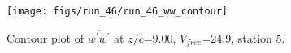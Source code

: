 \begin{figure}[H]
\centering
\texttt{[image: figs/run\_46/run\_46\_ww\_contour]}
\caption{Contour plot of $\overline{w^\prime w^\prime}$ at $z/c$=9.00, $V_{free}$=24.9, station 5.}
\label{fig:run_46_ww_contour}
\end{figure}


